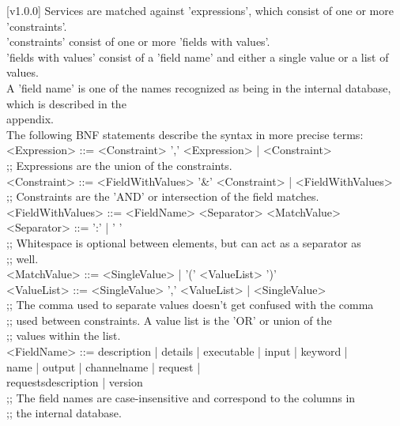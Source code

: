 [v1.0.0]
%
Services are matched against 'expressions', which consist of one or more
'constraints'.\\
'constraints' consist of one or more 'fields with values'.\\
'fields with values' consist of a 'field name' and either a single value or a list of
values.\\
A 'field name' is one of the names recognized as being in the internal database, which is
described in the\\
 appendix.\\

The following BNF statements describe the syntax in more precise terms:
\outputBegin{}
<Expression> ::= <Constraint> ',' <Expression> | <Constraint>\\
;; Expressions are the union of the constraints.\\

<Constraint> ::= <FieldWithValues> '\&' <Constraint> | <FieldWithValues>\\
;; Constraints are the 'AND' or intersection of the field matches.\\

<FieldWithValues> ::= <FieldName> <Separator> <MatchValue>\\
<Separator> ::= ':' | ' '\\
;; Whitespace is optional between elements, but can act as a separator as\\
;; well.\\

<MatchValue> ::= <SingleValue> | '(' <ValueList> ')'\\
<ValueList> ::= <SingleValue> ',' <ValueList> | <SingleValue>\\
;; The comma used to separate values doesn't get confused with the comma\\
;; used between constraints. A value list is the 'OR' or union of the\\
;; values within the list.\\

\settowidth{\utilLen}{<FieldName> ::= }%
<FieldName> ::= description | details | executable | input | keyword |\\
\hspace*{\utilLen}name | output | channelname | request |\\
\hspace*{\utilLen}requestsdescription | version\\
;; The field names are case-insensitive and correspond to the columns in\\
;; the internal database.\\

